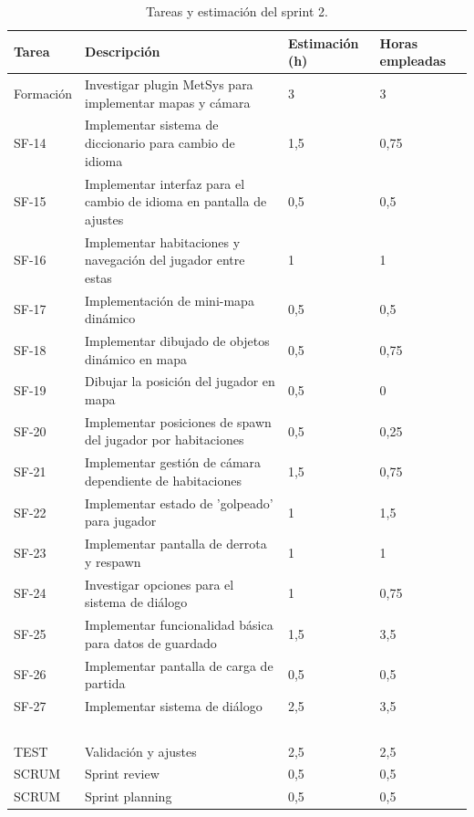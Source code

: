 \begin{table}[!ht]
    \centering
    \begin{tabular}{|l|p{8cm}|p{2cm}|p{2cm}|}
    \hline
        Tarea & Descripción & Estimación (h) & Horas empleadas \\ \hline
        Formación & Investigar plugin MetSys para implementar mapas y cámara & 3 & 3 \\ \hline
        SF-14 & Implementar sistema de diccionario para cambio de idioma & 1,5 & 0,75 \\ \hline
        SF-15 & Implementar interfaz para el cambio de idioma en pantalla de ajustes & 0,5 & 0,5 \\ \hline
        SF-16 & Implementar habitaciones y navegación del jugador entre estas & 1 & 1 \\ \hline
        SF-17 & Implementación de mini-mapa dinámico & 0,5 & 0,5 \\ \hline
        SF-18 & Implementar dibujado de objetos dinámico en mapa & 0,5 & 0,75 \\ \hline
        SF-19 & Dibujar la posición del jugador en mapa & 0,5 & 0 \\ \hline
        SF-20 & Implementar posiciones de spawn del jugador por habitaciones & 0,5 & 0,25 \\ \hline
        SF-21 & Implementar gestión de cámara dependiente de habitaciones & 1,5 & 0,75 \\ \hline
        SF-22 & Implementar estado de 'golpeado' para jugador & 1 & 1,5 \\ \hline
        SF-23 & Implementar pantalla de derrota y respawn & 1 & 1 \\ \hline
        SF-24 & Investigar opciones para el sistema de diálogo & 1 & 0,75 \\ \hline
        SF-25 & Implementar funcionalidad básica para datos de guardado & 1,5 & 3,5 \\ \hline
        SF-26 & Implementar pantalla de carga de partida & 0,5 & 0,5 \\ \hline
        SF-27 & Implementar sistema de diálogo & 2,5 & 3,5 \\ \hline
        ~ & ~ & ~ & ~ \\ \hline
        TEST & Validación y ajustes & 2,5 & 2,5 \\ \hline
        SCRUM & Sprint review & 0,5 & 0,5 \\ \hline
        SCRUM & Sprint planning & 0,5 & 0,5 \\ \hline
    \end{tabular}
    \caption{Tareas y estimación del sprint 2.}
    \label{tab:sprint2task}
\end{table}

